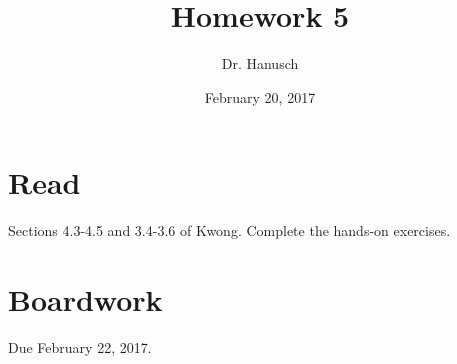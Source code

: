 \documentclass[12pt]{article}
\title{Homework 5}
\author{Dr. Hanusch}  %
\date{February 20, 2017}
\begin{document}
\newtheorem{thm}{Theorem}[section]
\newtheorem{cor}[thm]{Corollary}
\newtheorem{lem}[thm]{Lemma}
\newtheorem{prop}[thm]{Proposition}
\theoremstyle{definition}
\newtheorem{defn}[thm]{Definition}
\newtheorem{qu}[]{Question}
\theoremstyle{remark}
\newtheorem{rem}[thm]{Remark}
\newtheorem*{prf}{Proof}

\newcommand{\norm}[1]{\left\Vert#1\right\Vert}
\newcommand{\abs}[1]{\left\vert#1\right\vert}
\newcommand{\set}[1]{\left\{#1\right\}}
\newcommand{\Real}{\mathbb R}
\newcommand{\Zee}{\mathbb Z}
\newcommand{\eps}{\varepsilon}
\newcommand{\To}{\longrightarrow}
\newcommand{\BX}{\mathbf{B}(X)}
\newcommand{\A}{\mathcal{A}}
\newcommand{\U}{\mathcal{U}}
\newcommand{\power}{\mathscr{P}}




\maketitle

\section{Read}

Sections 4.3-4.5 and 3.4-3.6 of Kwong. Complete the hands-on exercises.

\section{Boardwork} 

Due February 22, 2017.

\end{document}
